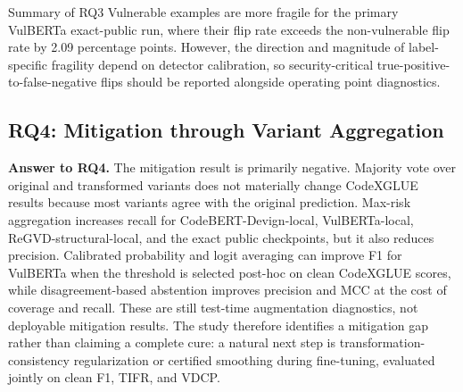 \documentclass[a4paper,fleqn]{cas-dc}
\begin{document}
\begin{table}[t]
  \centering
  \caption{Label-specific flip-rate tests.}
  \label{tab:rq3-public-tests}
\end{table}

\begin{rqsummarybox}{Summary of RQ3}
Vulnerable examples are more fragile for the primary VulBERTa exact-public run,
where their flip rate exceeds the non-vulnerable flip rate by 2.09 percentage
points. However, the direction and magnitude of label-specific fragility depend
on detector calibration, so security-critical true-positive-to-false-negative
flips should be reported alongside operating point diagnostics.
\end{rqsummarybox}

\subsection{RQ4: Mitigation through Variant Aggregation}

\textbf{Answer to RQ4.} The mitigation result is primarily negative. Majority
vote over original and transformed variants
does not materially change CodeXGLUE results because most variants agree with
the original prediction. Max-risk aggregation increases recall for
CodeBERT-Devign-local, VulBERTa-local, ReGVD-structural-local, and the exact
public checkpoints, but it also reduces precision. Calibrated probability and
logit averaging can improve F1 for VulBERTa when the threshold is selected
post-hoc on clean CodeXGLUE scores, while disagreement-based abstention improves
precision and MCC at the cost of coverage and recall. These are still
test-time augmentation diagnostics, not deployable mitigation results. The
study therefore identifies a mitigation gap rather than claiming a complete
cure: a natural next step is transformation-consistency regularization or
certified smoothing during fine-tuning, evaluated jointly on clean F1, TIFR, and
VDCP.
\end{document}
